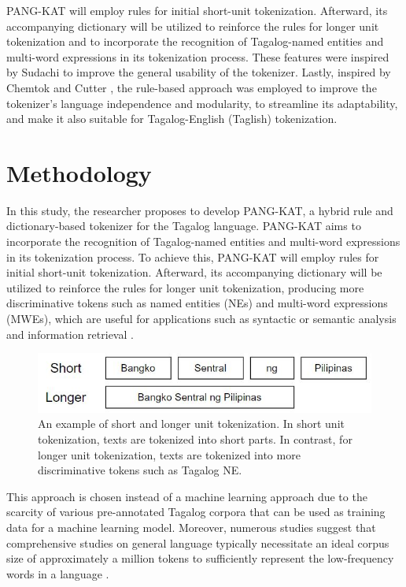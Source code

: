 \documentclass[journal]{./IEEE/IEEEtran}
\begin{document}
PANG-KAT will employ rules for initial short-unit tokenization. Afterward, its accompanying dictionary will be utilized to reinforce the rules for longer unit tokenization and to incorporate the recognition of Tagalog-named entities and multi-word expressions in its tokenization process. These features were inspired by Sudachi {\cite{Sudachi}} to improve the general usability of the tokenizer. Lastly, inspired by Chemtok {\cite{ChemTok}} and Cutter {\cite{Cutter}}, the rule-based approach was employed to improve the tokenizer’s language independence and modularity, to streamline its adaptability, and make it also suitable for Tagalog-English (Taglish) tokenization. 

\newpage

\section{Methodology}

In this study, the researcher proposes to develop PANG-KAT, a hybrid rule and dictionary-based tokenizer for the Tagalog language. PANG-KAT aims to incorporate the recognition of Tagalog-named entities and multi-word expressions in its tokenization process. To achieve this, PANG-KAT will employ rules for initial short-unit tokenization. Afterward, its accompanying dictionary will be utilized to reinforce the rules for longer unit tokenization, producing more discriminative tokens such as named entities (NEs) and multi-word expressions (MWEs), which are useful for applications such as syntactic or semantic analysis and information retrieval {\cite{Sudachi}}. \\

\begin{figure}[H]
    \centering
    \includegraphics[scale=0.66]{images/Short and Longer Unit Tokenization.JPG}
    \captionsetup{justification=centering}
    \caption{An example of short and longer unit tokenization. In short unit tokenization, texts are tokenized into short parts. In contrast, for longer unit tokenization, texts are tokenized into more discriminative tokens such as Tagalog NE.}
\end{figure}

This approach is chosen instead of a machine learning approach due to the scarcity of various pre-annotated Tagalog corpora {\cite{TweetTaglish}} that can be used as training data for a machine learning model. Moreover, numerous studies suggest that comprehensive studies on general language typically necessitate an ideal corpus size of approximately a million tokens to sufficiently represent the low-frequency words in a language {\cite{corpusSizeA}}  {\cite{corpusSizeC}} {\cite{corpusSizeB}}.\\
\end{document}
